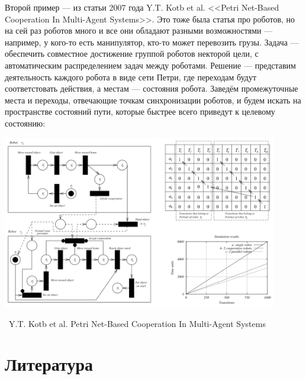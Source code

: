\documentclass[a5paper]{article}
\newcommand{\attribution}[1] {
	\vspace{-5mm}\begin{flushright}\begin{scriptsize}%
	{\textcopyright\, #1}\end{scriptsize}\end{flushright}
}
\begin{document}
Второй пример --- из статьи 2007 года Y.T. Kotb et al. <<Petri Net-Based Cooperation In Multi-Agent Systems>>. Это тоже была статья про роботов, но на сей раз роботов много и все они обладают разными возможностями --- например, у кого-то есть манипулятор, кто-то может перевозить грузы. Задача --- обеспечить совместное достижение группой роботов некторой цели, с автоматическим распределением задач между роботами. Решение --- представим деятельность каждого робота в виде сети Петри, где переходам будут соответстовать действия, а местам --- состояния робота. Заведём промежуточные места и переходы, отвечающие точкам синхронизации роботов, и будем искать на пространстве состояний пути, которые быстрее всего приведут к целевому состоянию:

\begin{center}
	\includegraphics[width=0.9\textwidth]{petriUsageExample2.png}
	\attribution{Y.T. Kotb et al. Petri Net-Based Cooperation In Multi-Agent Systems}
\end{center}

\section{Литература}
\end{document}
